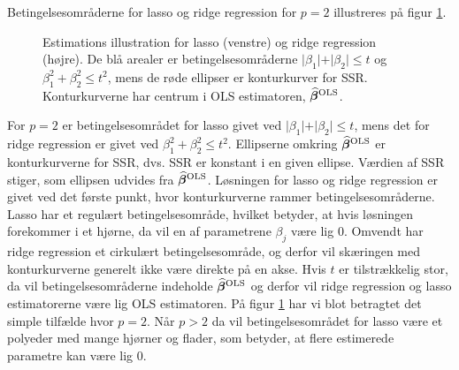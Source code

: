Betingelsesområderne for lasso og ridge regression for \(p=2\) illustreres på figur \ref{fig:LassoRig}.
%
\begin{figure}[H]
\centering
\begin{minipage}{0.4\linewidth}
\scalebox{0.7}{}
\end{minipage}
\hspace{0.2cm}
\begin{minipage}{0.4\linewidth}
\scalebox{0.7}{}
\end{minipage}
\caption{Estimations illustration for lasso (venstre) og ridge regression (højre). 
De blå arealer er betingelsesområderne $\vert \beta_1 \vert+\vert \beta_2 \vert \leq t$ og $\beta_1^2+\beta_2^2 \leq t^2$, mens de røde ellipser er konturkurver for SSR. Konturkurverne har centrum i OLS estimatoren, $\widehat{\boldsymbol{\beta}}^\text{OLS}$.} \label{fig:LassoRig}
\end{figure}
%
For $p=2$ er betingelsesområdet for lasso givet ved $\vert \beta_1 \vert + \vert \beta_2 \vert \leq t$, mens det for ridge regression er givet ved $\beta_1^2 + \beta_2^2 \leq t^2$.
Ellipserne omkring $\widehat{\boldsymbol{\beta}}^{\text{OLS}}$ er konturkurverne for SSR, dvs. SSR er konstant i en given ellipse. Værdien af SSR stiger, som ellipsen udvides fra $\widehat{\boldsymbol{\beta}}^{\text{OLS}}$.
Løsningen for lasso og ridge regression er givet ved det første punkt, hvor konturkurverne rammer betingelsesområderne.
Lasso har et regulært betingelsesområde, hvilket betyder, at hvis løsningen forekommer i et hjørne, da vil en af parametrene $\beta_j$ være lig 0.
Omvendt har ridge regression et cirkulært betingelsesområde, og derfor vil skæringen med konturkurverne generelt ikke være direkte på en akse.
Hvis $t$ er tilstrækkelig stor, da vil betingelsesområderne indeholde $\widehat{\boldsymbol{\beta}}^{\text{OLS}}$ og derfor vil ridge regression og lasso estimatorerne være lig OLS estimatoren.
På figur \ref{fig:LassoRig} har vi blot betragtet det simple tilfælde hvor $p=2$. 
Når \(p>2\) da vil betingelsesområdet for lasso være et polyeder med mange hjørner og flader, som betyder, at flere estimerede parametre kan være lig 0.
%
